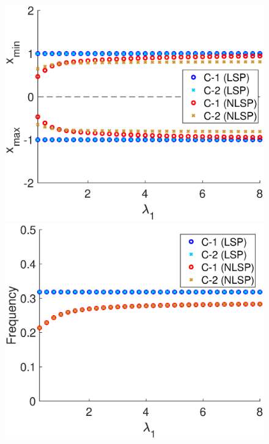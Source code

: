 \begin{figure}[h]
\begin{minipage}{0.45\linewidth}
\begin{center}
\end{center}
\end{minipage} 
 \begin{minipage}{0.45\linewidth}
  \begin{center}
\includegraphics[width=1\linewidth]{Images/photo21_3.eps}
\end{center}
  \end{minipage} 
  \begin{minipage}{0.45\linewidth}
  \begin{center}
\includegraphics[width=1\linewidth]{Images/photo21_4.eps}

\end{center}
\end{minipage}
\end{figure}
